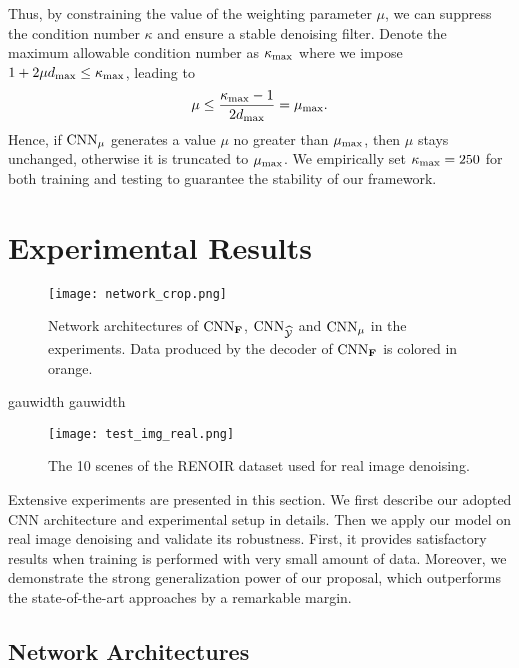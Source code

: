 \documentclass[10pt,twocolumn,letterpaper]{article}
\newcommand{\deflen}[2]{%
    \expandafter\newlength\csname #1\endcsname
    \expandafter\setlength\csname #1\endcsname{#2}%
}
\begin{document}
Thus, by constraining the value of the weighting parameter $\mu$, we can suppress the condition number $\kappa$ and ensure a stable denoising filter. 
Denote the maximum allowable condition number as $\kappa_{\rm max}$ where we impose $1+2\mu d_{\rm max}\le \kappa_{\max}$, leading to
%
\begin{equation}
\mu \le \frac{\kappa_{\rm max} - 1}{2d_{\rm max}}=\mu_{\rm max}.
\end{equation}
%
Hence, if ${\rm CNN}_{\mu}$ generates a value $\mu$ no greater than $\mu_{\rm max}$, then $\mu$ stays unchanged, otherwise it is truncated to $\mu_{\rm max}$. 
We empirically set $\kappa_{\rm max}=250$ for both training and testing to guarantee the stability of our framework. 


\section{Experimental Results}\label{sec:results}
%
\begin{figure*}[t]
\centering
    \texttt{[image: network\_crop.png]}
\caption{Network architectures of ${\rm CNN}_{\bf F}$, ${\rm CNN}_{\widehat{\cal Y}}$ and ${\rm CNN}_{\mu}$ in the experiments. Data produced by the decoder of ${\rm CNN}_{\bf F}$ is colored in orange. }
\label{fig:network}
\end{figure*}
%
\deflen{gauwidth}{82pt}
\begin{figure*}[t]
\centering
    \texttt{[image: test\_img\_real.png]}
\caption{The 10 scenes of the RENOIR dataset \cite{anaya2018renoir} used for real image denoising.}
\label{fig:realall}
\end{figure*}

Extensive experiments are presented in this section. 
We first describe our adopted CNN architecture and experimental setup in details. 
Then we apply our model on real image denoising and validate its robustness.
First, it provides satisfactory results when training is performed with very small amount of data.
Moreover, we demonstrate the strong generalization power of our proposal, which outperforms the state-of-the-art approaches by a remarkable margin. 
%
\subsection{Network Architectures}
\end{document}
